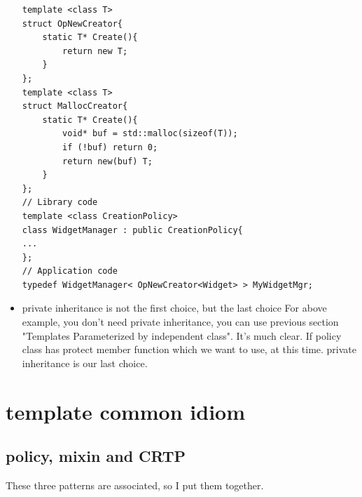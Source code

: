 \documentclass[a4paper,11pt,twoside]{book}
\begin{document}
\begin{itemize}
\begin{lstlisting}[numbers=none]
template <class T>
struct OpNewCreator{
	static T* Create(){
		return new T;
	}
};
template <class T>
struct MallocCreator{
	static T* Create(){
		void* buf = std::malloc(sizeof(T));
		if (!buf) return 0;
		return new(buf) T;
	}
}; 
// Library code
template <class CreationPolicy>
class WidgetManager : public CreationPolicy{
...
}; 
// Application code
typedef WidgetManager< OpNewCreator<Widget> > MyWidgetMgr; 
\end{lstlisting}

\item private inheritance is not the first choice, but the last choice For above example, you don't need private inheritance, you can use previous section "Templates Parameterized by independent class". It's much clear. If policy class has protect member function which we want to use, at this time. private inheritance is our last choice. 
\end{itemize}


\section{template common idiom}


\subsection{policy, mixin and CRTP}
These three patterns are associated, so I put them together. 
\end{document}
